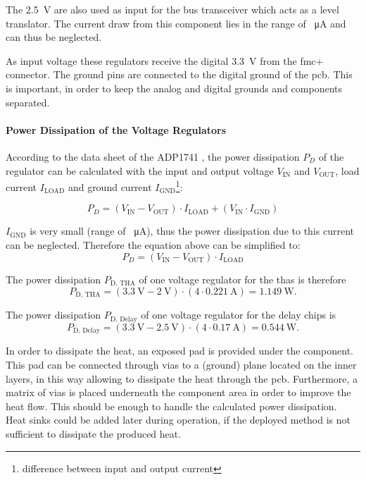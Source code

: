 The \SI{2.5}{\volt} are also used as input for the bus transceiver which acts as a level translator. 
The current draw from this component lies in the range of \SI{}{\micro \ampere} and can thus be neglected.

As input voltage these regulators receive the digital \SI{3.3}{\volt} from the \gls{fmc}+ connector.
The ground pins are connected to the digital ground of the \gls{pcb}.
This is important, in order to keep the analog and digital grounds and components separated.

\paragraph{Power Dissipation of the Voltage Regulators}
According to the data sheet of the ADP1741 \cite{adp1741}, the power dissipation $P_D$ of the regulator can be calculated with the input and output voltage $V_\text{IN}$ and $V_\text{OUT}$, load current $I_\text{LOAD}$ and ground current $I_\text{GND}$\footnote{difference between input and output current}:

\begin{equation}
	P_D = (V_\text{IN} - V_\text{OUT}) \cdot I_\text{LOAD} + (V_\text{IN} \cdot I_\text{GND})
\end{equation}

$I_\text{GND}$ is very small (range of \SI{}{\micro \ampere}), thus the power dissipation due to this current can be neglected.
Therefore the equation above can be simplified to:
\begin{equation}
	P_D = (V_\text{IN} - V_\text{OUT}) \cdot I_\text{LOAD}
\end{equation}

The power dissipation $P_\text{D, THA}$ of one voltage regulator for the \glspl{tha} is therefore
\begin{equation}
	P_\text{D, THA} = (\SI{3.3}{\volt} - \SI{2}{\volt}) \cdot (4 \cdot \SI{0.221}{\ampere}) = \SI{1.149}{\watt}.
\end{equation}

The power dissipation $P_\text{D, Delay}$ of one voltage regulator for the delay chips is 
\begin{equation}
	P_\text{D, Delay} = (\SI{3.3}{\volt} - \SI{2.5}{\volt}) \cdot (4 \cdot \SI{0.17}{\ampere}) = \SI{0.544}{\watt}.
\end{equation}

In order to dissipate the heat, an exposed pad is provided under the component.
This pad can be connected through vias to a (ground) plane located on the inner layers, in this way allowing to dissipate the heat through the \gls{pcb}.
Furthermore, a matrix of vias is placed underneath the component area in order to improve the heat flow.
This should be enough to handle the calculated power dissipation.
Heat sinks could be added later during operation, if the deployed method is not sufficient to dissipate the produced heat.

